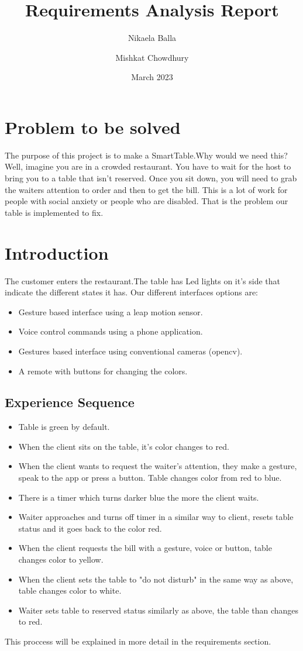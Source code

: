 \documentclass{article}
\title{Requirements Analysis Report}
\author{Nikaela Balla }
\author{Mishkat Chowdhury}
\date{March 2023}
\begin{document}
\maketitle

\section{ Problem to be solved}
\label{sec:problem}
The purpose of this project is to make a SmartTable.Why would we need this? 
Well, imagine you are in a crowded restaurant. You have to wait for the host to bring you to a table that isn't reserved. Once you sit down,
you will need to grab the waiters attention to order and then to get the bill. This is a lot of work for people with social anxiety or people 
who are disabled. That is the problem our table is implemented to fix.
\section{ Introduction}
The customer enters the restaurant.The table has Led lights on it's side that indicate the different states it has. Our different interfaces 
options are: \begin{itemize}
    \item Gesture based interface using a leap motion sensor.
    \item  Voice control commands using a phone application.
    \item  Gestures based interface using conventional cameras (opencv).
    \item A remote with buttons for changing the colors.
\end{itemize}
\subsection{Experience Sequence }
\begin{itemize}
    \item Table is green by default.
    \item  When the client sits on the table, it's color changes to red.
    \item When the client wants to request the waiter's attention, they make a gesture, speak to the app or press a button. 
    Table changes color from  red to blue.
    \item  There is  a timer which turns darker blue the more the client waits.
    \item Waiter approaches and turns off timer in a similar way to client, resets table status and it goes back to the color red.
    \item When the client requests the bill with a gesture, voice or button, table changes color to yellow.
    \item When the client sets the table to "do not disturb" in the same way as above, table changes color to white.
    \item Waiter sets table to reserved status similarly as above, the table than changes to red.
\end{itemize}
This proccess will be explained in more detail in the requirements section.
\end{document}
